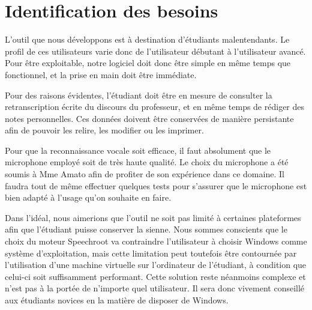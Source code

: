 \chapter{Identification des besoins}

L'outil que nous développons est à destination d'étudiants malentendants.
Le profil de ces utilisateurs varie donc de l'utilisateur débutant à l'utilisateur avancé.
Pour être exploitable, notre logiciel doit donc être simple en même temps que fonctionnel, et la prise en main doit être immédiate.

Pour des raisons évidentes, l'étudiant doit être en mesure de consulter la retranscription écrite du discours du professeur, et en même temps de rédiger des notes personnelles.
Ces données doivent être conservées de manière persistante afin de pouvoir les relire, les modifier ou les imprimer.

Pour que la reconnaissance vocale soit efficace, il faut absolument que le microphone employé soit de très haute qualité.
Le choix du microphone a été soumis à Mme Amato afin de profiter de son expérience dans ce domaine.
Il faudra tout de même effectuer quelques tests pour s'assurer que le microphone est bien adapté à l'usage qu'on souhaite en faire.

Dans l'idéal, nous aimerions que l'outil ne soit pas limité à certaines plateformes afin que l'étudiant puisse conserver la sienne.
Nous sommes conscients que le choix du moteur Speechroot va contraindre l'utilisateur à choisir Windows comme système d'exploitation, mais cette limitation peut toutefois être contournée par l'utilisation d'une machine virtuelle sur l'ordinateur de l'étudiant, à condition que celui-ci soit suffisamment performant.
Cette solution reste néanmoins complexe et n'est pas à la portée de n'importe quel utilisateur.
Il sera donc vivement conseillé aux étudiants novices en la matière de disposer de Windows.
